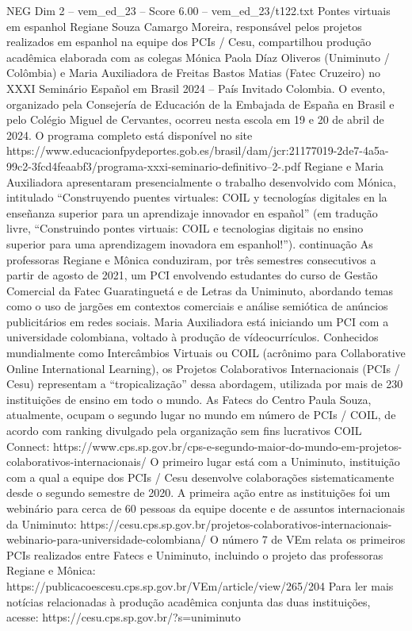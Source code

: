 \begin{textsample}{NEG Dim 2 – vem\_ed\_23 – Score 6.00 – vem\_ed\_23/t122.txt}  \label{ex:f2_neg_084}
Pontes virtuais em espanhol Regiane Souza Camargo Moreira, responsável pelos projetos realizados em espanhol na equipe dos PCIs / Cesu, compartilhou produção acadêmica elaborada com as colegas Mónica Paola Díaz Oliveros (Uniminuto / Colômbia) e Maria Auxiliadora de Freitas Bastos Matias (Fatec Cruzeiro) no XXXI Seminário Español em Brasil 2024 – País Invitado Colombia.
O evento, organizado pela Consejería de Educación de la Embajada de España en Brasil e pelo Colégio Miguel de Cervantes, ocorreu nesta escola em 19 e 20 de abril de 2024.
O programa completo está disponível no site https://www.educacionfpydeportes.gob.es/brasil/dam/jcr:21177019-2de7-4a5a-99c2-3fcd4feaabf3/programa-xxxi-seminario-definitivo--2-.pdf Regiane e Maria Auxiliadora apresentaram presencialmente o trabalho desenvolvido com Mónica, intitulado “Construyendo puentes virtuales: COIL y tecnologías digitales en la enseñanza superior para un aprendizaje innovador en español” (em tradução livre, “Construindo pontes virtuais: COIL e tecnologias digitais no ensino superior para uma aprendizagem inovadora em espanhol!”). continuação As professoras Regiane e Mônica conduziram, por três semestres consecutivos a partir de agosto de 2021, um PCI envolvendo estudantes do curso de Gestão Comercial da Fatec Guaratinguetá e de Letras da Uniminuto, abordando temas como o uso de jargões em contextos comerciais e análise semiótica de anúncios publicitários em redes sociais.
Maria Auxiliadora está iniciando um PCI com a universidade colombiana, voltado à produção de vídeocurrículos.
Conhecidos mundialmente como Intercâmbios Virtuais ou COIL (acrônimo para Collaborative Online International Learning), os Projetos Colaborativos Internacionais (PCIs / Cesu) representam a “tropicalização” dessa abordagem, utilizada por mais de 230 instituições de ensino em todo o mundo.
As Fatecs do Centro Paula Souza, atualmente, ocupam o segundo lugar no mundo em número de PCIs / COIL, de acordo com ranking divulgado pela organização sem fins lucrativos COIL Connect: https://www.cps.sp.gov.br/cps-e-segundo-maior-do-mundo-em-projetos-colaborativos-internacionais/ O primeiro lugar está com a Uniminuto, instituição com a qual a equipe dos PCIs / Cesu desenvolve colaborações sistematicamente desde o segundo semestre de 2020.
A primeira ação entre as instituições foi um webinário para cerca de 60 pessoas da equipe docente e de assuntos internacionais da Uniminuto: https://cesu.cps.sp.gov.br/projetos-colaborativos-internacionais-webinario-para-universidade-colombiana/ O número 7 de VEm relata os primeiros PCIs realizados entre Fatecs e Uniminuto, incluindo o projeto das professoras Regiane e Mônica: https://publicacoescesu.cps.sp.gov.br/VEm/article/view/265/204 Para ler mais notícias relacionadas à produção acadêmica conjunta das duas instituições, acesse: https://cesu.cps.sp.gov.br/?s=uniminuto

\end{textsample}
